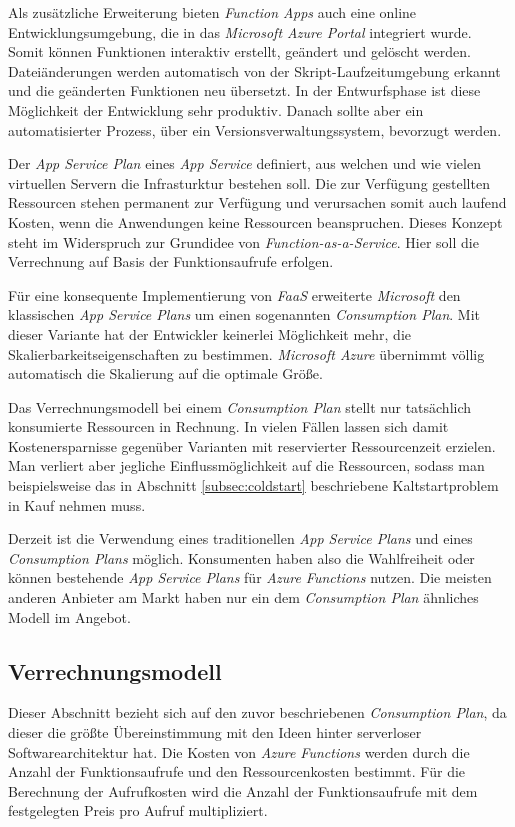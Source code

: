 Als zusätzliche Erweiterung bieten \textit{Function Apps} auch eine online Entwicklungsumgebung, die in das \textit{Microsoft Azure Portal} integriert wurde. Somit können Funktionen interaktiv erstellt, geändert und gelöscht werden. Dateiänderungen werden automatisch von der Skript-Laufzeitumgebung erkannt und die geänderten Funktionen neu übersetzt. In der Entwurfsphase ist diese Möglichkeit der Entwicklung sehr produktiv. Danach sollte aber ein automatisierter Prozess, \zB über ein Versionsverwaltungssystem, bevorzugt werden.

Der \textit{App Service Plan} eines \textit{App Service} definiert, aus welchen und wie vielen virtuellen Servern die Infrasturktur bestehen soll. Die zur Verfügung gestellten Ressourcen stehen permanent zur Verfügung und verursachen somit auch laufend Kosten, wenn die Anwendungen keine Ressourcen beanspruchen. Dieses Konzept steht im Widerspruch zur Grundidee von \textit{Function-as-a-Service}. Hier soll die Verrechnung auf Basis der Funktionsaufrufe erfolgen. 

Für eine konsequente Implementierung von \textit{FaaS} erweiterte \textit{Microsoft} den klassischen \textit{App Service Plans} um einen sogenannten \textit{Consumption Plan}. Mit dieser Variante hat der Entwickler keinerlei Möglichkeit mehr, die Skalierbarkeitseigenschaften zu bestimmen. \textit{Microsoft Azure} übernimmt völlig automatisch die Skalierung auf die optimale Größe.

Das Verrechnungsmodell bei einem \textit{Consumption Plan} stellt nur tatsächlich konsumierte Ressourcen in Rechnung. In vielen Fällen lassen sich damit Kostenersparnisse gegenüber Varianten mit reservierter Ressourcenzeit erzielen. Man verliert aber jegliche Einflussmöglichkeit auf die Ressourcen, sodass man beispielsweise das in Abschnitt \ref{subsec:coldstart} beschriebene Kaltstartproblem in Kauf nehmen muss.

Derzeit ist die Verwendung eines traditionellen \textit{App Service Plans} und eines \textit{Consumption Plans} möglich. Konsumenten haben also die Wahlfreiheit oder können bestehende \textit{App Service Plans} für \textit{Azure Functions} nutzen. Die meisten anderen Anbieter am Markt haben nur ein dem \textit{Consumption Plan} ähnliches Modell im Angebot.

\subsection{Verrechnungsmodell}

Dieser Abschnitt bezieht sich auf den zuvor beschriebenen \textit{Consumption Plan}, da dieser die größte Übereinstimmung mit den Ideen hinter serverloser Softwarearchitektur hat. Die Kosten von \textit{Azure Functions} werden durch die Anzahl der Funktionsaufrufe und den Ressourcenkosten bestimmt. Für die Berechnung der Aufrufkosten wird die Anzahl der Funktionsaufrufe mit dem festgelegten Preis pro Aufruf multipliziert.

